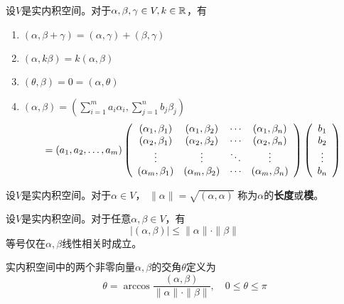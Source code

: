 \begin{theorem}[实内积空间的性质] \label{thrm:real-inner-prod-space-prop}
  设$V$是实内积空间。对于$\alpha,\beta,\gamma\in V, k\in\mfR$，有
  \begin{enumerate}
    \item \label{thrm:RIPS-prop1}
    $(\alpha,\beta+\gamma)=(\alpha,\gamma)+(\beta,\gamma)$
    \item
    $(\alpha,k\beta)=k(\alpha,\beta)$
    \item
    $(\theta,\beta)=0=(\alpha,\theta)$
    \item
    $(\alpha,\beta)=
      \left(\sum_{i=1}^{m}a_i\alpha_i,\sum_{j=1}^{n}b_j\beta_j\right) $
    \begin{equation} \label{eq:metric-mat}
      = (a_1,a_2,\dots,a_m) \mmat{cccc}{
        (\alpha_1,\beta_1)&(\alpha_1,\beta_2)&\cdots&(\alpha_1,\beta_n)\\
        (\alpha_2,\beta_1)&(\alpha_2,\beta_2)&\cdots&(\alpha_2,\beta_n)\\
        \vdots            &\vdots            &\ddots&\vdots            \\
        (\alpha_m,\beta_1)&(\alpha_m,\beta_2)&\cdots&(\alpha_m,\beta_n)}
        \mmat{c}{b_1 \\ b_2 \\ \vdots \\ b_n}
    \end{equation}
  \end{enumerate}
\end{theorem}

\begin{definition}[长度]
  设$V$是实内积空间。对于$\alpha\in V$，
  $\| \alpha \| = \sqrt{(\alpha,\alpha)}$
  称为$\alpha$的\textbf{长度}或\textbf{模}。
\end{definition}

\begin{theorem}
  设$V$是实内积空间。对于任意$\alpha,\beta\in V$，有
  \begin{displaymath}
    |(\alpha,\beta)| \le \|\alpha\|\cdot\|\beta\|
  \end{displaymath}
  等号仅在$\alpha,\beta$线性相关时成立。
\end{theorem}

\begin{definition}[交角]
  实内积空间中的两个非零向量$\alpha,\beta$的交角$\theta$定义为
  \begin{displaymath}
    \theta = \arccos\frac{(\alpha,\beta)}{\|\alpha\|\cdot\|\beta\|},
    \quad  0\le\theta\le\pi
  \end{displaymath}
\end{definition}

